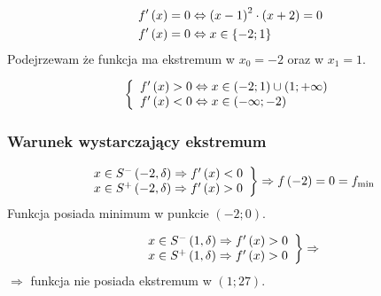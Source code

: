 \documentclass[a4paper,12pt]{article}
\newcommand{\podx}{
		\ensuremath f' \left( x \right)
	}
\begin{document}
\begin{align*}
	\podx &= 0 \Leftrightarrow \left( x - 1 \right)^2 \cdot \left( x + 2 \right)  = 0\\
	\podx &= 0 \Leftrightarrow x \in \left\{ -2; 1 \right\}
\end{align*}
Podejrzewam że funkcja ma ekstremum w $x_0 = -2$ oraz w $x_1 = 1$.
\begin{figure}[h]
	\centering
\end{figure}

\[ \left\{
	\begin{array}{l}
		\podx > 0 \Leftrightarrow x \in \left( -2; 1 \right) \cup \left( 1; + \infty \right) \\
		\podx < 0 \Leftrightarrow x \in \left( - \infty; -2 \right)
	\end{array}
\right. \]

\subsubsection*{Warunek wystarczający ekstremum}

\[ \left.
		\begin{array}{l}
			x \in S^- \left( -2, \delta \right) \Rightarrow \podx < 0 \\
			x \in S^+ \left( -2, \delta \right) \Rightarrow \podx > 0
		\end{array}
	\right\} \Rightarrow f \left( -2 \right) = 0 = f_{\text{min}}
\]
Funkcja posiada minimum w punkcie $\left( -2; 0 \right)$.

\[ \left.
		\begin{array}{l}
			x \in S^- \left( 1, \delta \right) \Rightarrow \podx > 0 \\
			x \in S^+ \left( 1, \delta \right) \Rightarrow \podx > 0
		\end{array}
	\right\} \Rightarrow 
\]
$\Rightarrow$ funkcja nie posiada ekstremum w $\left( 1; 27 \right)$.
\end{document}
